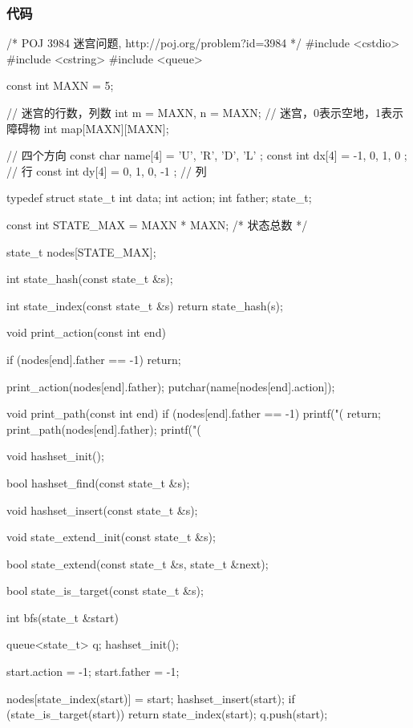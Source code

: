 \subsubsection{代码}
\begin{Codex}[label=maze.c]
/* POJ 3984 迷宫问题, http://poj.org/problem?id=3984 */
#include <cstdio>
#include <cstring>
#include <queue>

const int MAXN = 5;

// 迷宫的行数，列数
int m = MAXN, n = MAXN;
// 迷宫，0表示空地，1表示障碍物
int map[MAXN][MAXN];

// 四个方向
const char name[4] = { 'U', 'R', 'D', 'L' };
const int dx[4] = { -1, 0, 1, 0 }; // 行
const int dy[4] = { 0, 1, 0, -1 }; // 列


typedef struct state_t {
    int data;
    int action;
    int father;
} state_t;

const int STATE_MAX = MAXN * MAXN;  /* 状态总数 */

state_t nodes[STATE_MAX];

int state_hash(const state_t &s);

int state_index(const state_t &s) {
    return state_hash(s);
}

void print_action(const int end) {
    if (nodes[end].father == -1) return;

    print_action(nodes[end].father);
    putchar(name[nodes[end].action]);
}

void print_path(const int end) {
    if (nodes[end].father == -1) {
        printf("(%
        return;
    }
    print_path(nodes[end].father);
    printf("(%
}

void hashset_init();

bool hashset_find(const state_t &s);

void hashset_insert(const state_t &s);

void state_extend_init(const state_t &s);

bool state_extend(const state_t &s, state_t &next);

bool state_is_target(const state_t &s);

int bfs(state_t &start) {
    queue<state_t> q;
    hashset_init();

    start.action = -1;
    start.father = -1;

    nodes[state_index(start)] = start;
    hashset_insert(start);
    if (state_is_target(start))
        return state_index(start);
    q.push(start);

}
\end{Codex}
